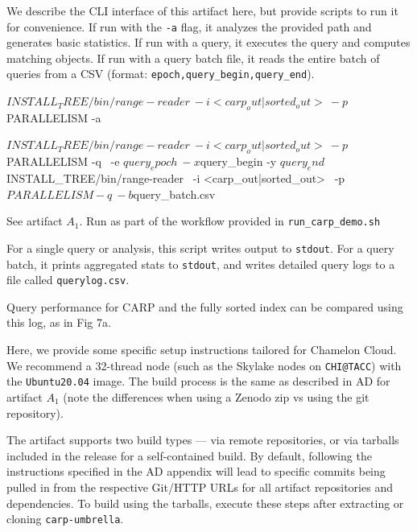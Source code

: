\documentclass[conference]{IEEEtran}
\newenvironment{example}
{\minted[bgcolor=GhostWhite,fontsize=\small]{text}}
{\endminted}
\begin{document}
\artin

We describe the CLI interface of this artifact here, but provide scripts to run it for convenience. If run with the \texttt{-a} flag, it analyzes the provided path and generates basic statistics. If run with a query, it executes the query and computes matching objects. If run with a query batch file, it reads the entire batch of queries from a CSV (format: \texttt{epoch,query\_begin,query\_end}).

\begin{example}
$INSTALL_TREE/bin/range-reader \
    -i <carp_out|sorted_out> \
    -p $PARALLELISM -a
    
$INSTALL_TREE/bin/range-reader \
    -i <carp_out|sorted_out> \
    -p $PARALLELISM -q \
    -e $query_epoch \
    -x $query_begin -y $query_end
    
$INSTALL_TREE/bin/range-reader \
    -i <carp_out|sorted_out> \
    -p $PARALLELISM -q \
    -b $query_batch.csv
\end{example}

\artcomp

 See artifact $A_1$.
\artinpart{Executing} Run as part of the workflow provided in \texttt{run\_carp\_demo.sh}

\artout

For a single query or analysis, this script writes output to \texttt{stdout}. For a query batch, it prints aggregated stats to \texttt{stdout}, and writes detailed query logs to a file called \texttt{querylog.csv}.

Query performance for CARP and the fully sorted index can be compared using this log, as in Fig 7a.



\newpage
\appendixAE


\artin

Here, we provide some specific setup instructions tailored for Chamelon Cloud. We recommend a 32-thread node (such as the Skylake nodes on \texttt{CHI@TACC}) with the \texttt{Ubuntu20.04} image. The build process is the same as described in AD for artifact $A_1$ (note the differences when using a Zenodo zip vs using the git repository).

The artifact supports two build types --- via remote repositories, or via tarballs included in the release for a self-contained build. By default, following the instructions specified in the AD appendix will lead to specific commits being pulled in from the respective Git/HTTP URLs for all artifact repositories and dependencies. To build using the tarballs, execute these steps after extracting or cloning \texttt{carp-umbrella}.
\end{document}
